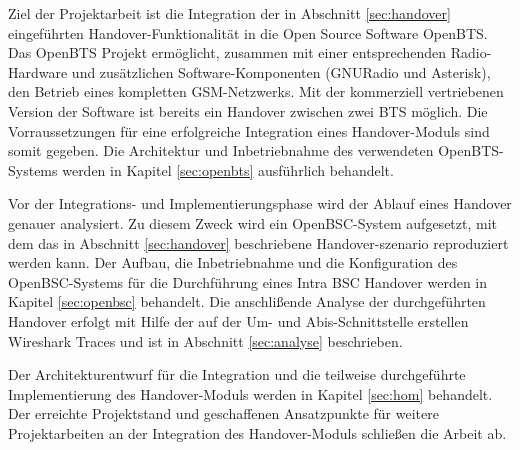 Ziel der Projektarbeit ist die Integration der in Abschnitt \ref{sec:handover} eingeführten Handover-Funktionalität in die Open Source Software OpenBTS. Das OpenBTS Projekt ermöglicht, zusammen mit einer entsprechenden Radio-Hardware und zusätzlichen Software-Komponenten (GNURadio und Asterisk), den Betrieb eines kompletten GSM-Netzwerks. Mit der kommerziell vertriebenen Version der Software ist bereits ein Handover zwischen zwei BTS möglich. Die Vorraussetzungen für eine erfolgreiche Integration eines Handover-Moduls sind somit gegeben. Die Architektur und Inbetriebnahme des verwendeten OpenBTS-Systems werden in Kapitel \ref{sec:openbts} ausführlich behandelt.

Vor der Integrations- und Implementierungsphase wird der Ablauf eines Handover genauer analysiert. Zu diesem Zweck wird ein OpenBSC-System aufgesetzt, mit dem das in Abschnitt \ref{sec:handover} beschriebene Handover-szenario reproduziert werden kann. Der Aufbau, die Inbetriebnahme und die Konfiguration des OpenBSC-Systems für die Durchführung eines Intra BSC Handover werden in Kapitel \ref{sec:openbsc} behandelt. Die anschlißende Analyse der durchgeführten Handover erfolgt mit Hilfe der auf der Um- und Abis-Schnittstelle erstellen Wireshark Traces und ist in Abschnitt \ref{sec:analyse} beschrieben.

Der Architekturentwurf für die Integration und die teilweise durchgeführte Implementierung des Handover-Moduls werden in Kapitel \ref{sec:hom} behandelt. Der erreichte Projektstand und geschaffenen Ansatzpunkte für weitere Projektarbeiten an der Integration des Handover-Moduls schließen die Arbeit ab.


